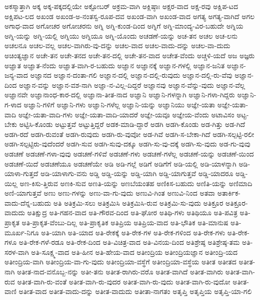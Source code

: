 {ಅಕಸ್ಮಾತ್ತಾಗಿ
ಅಕ್ಕ
ಅಕ್ಕ-ಪಕ್ಕದಲ್ಲಿಯೇ
ಅಕ್ಟೋಬರ್
ಅಕ್ರಮ-ವಾಗಿ
ಅಕ್ಲಿಷ್ಠಾಃ
ಅಕ್ಷರ-ವಾದ
ಅಕ್ಷ-ರವು
ಅಕ್ಷಿಪ-ಟದ
ಅಕ್ಷಿಪಟ-ಲದ
ಅಖಂಡ
ಅಖಂಡ-ಅ-ನಂತಸ್ವ-ರೂಪ-ದವ
ಅಖಂಡ-ವಾಗಿ
ಅಖಂಡ-ವಾದ
ಅಗತ್ಯ
ಅಗತ್ಯ-ವಾಗಿದೆ
ಅಗಲ
ಅಗಾಧ-ವಾದ
ಅಗೋಚರ
ಅಗೋಚರನು
ಅಗ್ನಿ
ಅಗ್ನಿ-ಕುಂಡ-ದಿಂದ
ಅಗ್ನಿಗೆ
ಅಗ್ನಿ-ಮಾಂದ್ಯ-ವಿರ-ಬಹುದೇ
ಅಗ್ನಿಯ
ಅಗ್ನಿ-ಯನ್ನು
ಅಗ್ನಿ-ಯಲ್ಲಿ
ಅಗ್ನಿಯು
ಅಗ್ನಿಯೂ
ಅಗ್ನಿ-ಯೊಂದು
ಅಚಡಣೆ-ಯನ್ನು
ಅಚ-ತನ
ಅಚಲ
ಅಚ-ಲನು
ಅಚಲನೂ
ಅಚಲ-ವಲ್ಲ
ಅಚಲ-ವಾಗಿರು-ವು-ದನ್ನು
ಅಚಲ-ವಾದ
ಅಚಲ-ವಾದು-ದನ್ನು
ಅಚಲ-ವಾ-ದುದು
ಅಚಿಂತ್ಯಜ್ಞಾನ
ಅಚೇ-ತನ
ಅಚೇ-ತನದ
ಅಚೇ-ತನ-ದಲ್ಲಿ
ಅಚೇ-ತನ-ವಾದ
ಅಚೇತ-ವೆಂದು
ಅಚ್ಚಳಿ-ಯದೆ
ಅಜ
ಅಜ್ಞರು
ಅಜ್ಞಾತ
ಅಜ್ಞಾತ-ನೆಂದು
ಅಜ್ಞಾತ-ವಾಗಿ-ರ-ಬಹುದು
ಅಜ್ಞಾನ
ಅಜ್ಞಾನಕ್ಕೆ
ಅಜ್ಞಾನ-ಗಳಲ್ಲಿ
ಅಜ್ಞಾನ-ಜನಿತ
ಅಜ್ಞಾನ-ಜನ್ಯ-ವಾದ
ಅಜ್ಞಾನದ
ಅಜ್ಞಾನ-ದಂತಾ-ಗಲಿ
ಅಜ್ಞಾನ-ದಲ್ಲಿ
ಅಜ್ಞಾನ-ದಲ್ಲಿ-ರುವುದು
ಅಜ್ಞಾನ-ದಲ್ಲಿ-ರು-ವೆವು
ಅಜ್ಞಾನ-ದಿಂದ
ಅಜ್ಞಾನ-ವನ್ನು
ಅಜ್ಞಾನ-ವಶ-ನಾಗಿ
ಅಜ್ಞಾ-ನ-ವಿಲ್ಲ-ದಿದ್ದರೆ
ಅಜ್ಞಾನವು
ಅಜ್ಞಾನ-ವೆನ್ನು-ವುದು
ಅಜ್ಞಾನ-ವೆಲ್ಲ
ಅಜ್ಞಾನವೇ
ಅಜ್ಞಾನಾಂಧ-ಕಾರ-ದಲ್ಲಿ
ಅಜ್ಞಾನಾ-ತೀತ-ನಾದ
ಅಜ್ಞಾನಿ
ಅಜ್ಞಾನಿ-ಗಳನ್ನಾಗಿ
ಅಜ್ಞಾನಿ-ಗಳಾ-ಗಿದ್ದರು
ಅಜ್ಞಾನಿ-ಗ-ಳಾದ
ಅಜ್ಞಾನಿ-ಗಳಿಗೆ
ಅಜ್ಞಾನಿ-ಗಳು
ಅಜ್ಞಾನಿ-ಗಳೆಲ್ಲ
ಅಜ್ಞಾನಿ-ಯನ್ನು
ಅಜ್ಞಾನಿಯು
ಅಜ್ಞೇ-ಯತಾ
ಅಜ್ಞೇ-ಯತಾ-ವಾದಿ
ಅಜ್ಞೇ-ಯತಾ-ವಾದಿ-ಗಳು
ಅಜ್ಞೇ-ಯತಾ-ವಾದಿ-ಯಾದರೆ
ಅಜ್ಞೇ-ಯವೂ
ಅಜ್ಞೇಯ-ವೆಂದು
ಅಟಾವಿಸಂ
ಅಟ್ಟ-ಬೇಕು
ಅಟ್ಟಿಸಿ-ಕೊಂಡು
ಅಟ್ಟುತ್ತವೆ
ಅಟ್ಟುತ್ತಿದ್ದರೆ
ಅಡಕ-ಮಾಡಿ-ದ್ದಾರೆ
ಅಡಗಿ
ಅಡಗಿ-ಕೊಂಡು
ಅಡ-ಗಿತ್ತು
ಅಡ-ಗಿದೆ
ಅಡಗಿ-ರದೆ
ಅಡಗಿ-ರುವಂತೆ
ಅಡಗಿ-ರುವುದು
ಅಡಗಿ-ರು-ವುವೋ
ಅಡ-ಗಿವೆ
ಅಡಗಿ-ಸ-ಬೇಕಾ-ಗಿದೆ
ಅಡಗಿ-ಸಲ್ಪಟ್ಟಿ-ರಲೀ
ಅಡಗಿ-ಸಲ್ಪಟ್ಟಿರು-ವುದೆಂದರೆ
ಅಡಗಿ-ಸುವ
ಅಡಗಿ-ಸುವು-ದಕ್ಕೂ
ಅಡಗಿ-ಸು-ವು-ದಕ್ಕೆ
ಅಡಗಿ-ಸು-ವುದು
ಅಡ-ಗು-ವುವು
ಅಡಚಣೆ
ಅಡಚಣೆ-ಗಳಾ-ವುವು
ಅಡಚಣೆ-ಗಳಿವೆ
ಅಡಚಣೆ-ಗಳು
ಅಡಚಣೆ-ಗಳೆಲ್ಲ
ಅಡಚಣೆ-ಯನ್ನು
ಅಡಚಣೆ-ಯಿಂದ
ಅಡಚಣೆ-ಯಿದೆ
ಅಡಚಣೆಯೂ
ಅಡಚಣೆಯೇ
ಅಡಿ
ಅಡಿ-ಗಲ್ಲೆ
ಅಡಿಗೆ
ಅಡಿಗೆಗೆ
ಅಡಿ-ಯಲ್ಲಿ
ಅಡಿ-ಯಾಳನ್ನಾಗಿ
ಅಡಿ-ಯಾಳಾ-ಗುತ್ತದೆ
ಅಡಿ-ಯಾಳಾಗು-ವನು
ಅಡ್ಡಿ
ಅಡ್ಡಿ-ಯನ್ನು
ಅಡ್ಡಿ-ಯಾಗಿ
ಅಡ್ಡಿ-ಯಾಗುತ್ತವೆ
ಅಡ್ಡಿ-ಯಾದರೂ
ಅಡ್ಡಿ-ಯಿಲ್ಲ
ಅಣ-ಕಿಸು-ತ್ತಿರುವ
ಅಣಕಿ-ಸುವ
ಅಣತಿ-ಯನ್ನು
ಅಣಬೆಯಂತಹ
ಅಣಿಕಿಸ-ಬಹುದು
ಅಣಿತಿ-ಯನ್ನು
ಅಣಿಮಾದಿ
ಅಣಿ-ಯಾಗುತ್ತವೆ
ಅಣು
ಅಣು-ಗಳನ್ನು
ಅಣು-ವಾ-ಗು-ವುದು
ಅಣುವಿ-ಗಿಂತ
ಅಣುವಿ-ನಿಂದ
ಅತವಾ
ಅತಾರ್ಕಿಕ-ವಾದು-ದೆನ್ನ-ಬಹುದು
ಅತಿ
ಅತಿಕ್ರಮಿ-ಸಲು
ಅತಿಕ್ರಮಿಸಿ
ಅತಿಕ್ರಮಿಸಿ-ರುವ
ಅತಿಕ್ರಮಿ-ಸು-ವುದು
ಅತಿಕ್ರೂರ
ಅತಿಕ್ರೂರ-ವಾದುದು
ಅತಿಕ್ಷುದ್ರ
ಅತಿ-ಗಹನ-ವಾದ
ಅತಿ-ಗೌರವ-ದಿಂದ
ಅತಿ-ಘೋರ
ಅತಿಥಿ-ಗಳು
ಅತಿಥಿಯೂ
ಅತಿ-ಪವಿತ್ರ
ಅತಿ-ಪ್ರಾಕೃತ
ಅತಿ-ಪ್ರಾಕೃತ-ವೆಂಬು-ದಿಲ್ಲ
ಅತಿ-ಪ್ರಾಕೃತಿಕ
ಅತಿಪ್ರಿಯ
ಅತಿಪ್ರಿಯ-ವಾದ
ಅತಿ-ಭೌತಿಕ
ಅತಿ-ಮಾನುಷ
ಅತಿ-ಮೂರ್ಖ-ನಿಗೂ
ಅತಿ-ಯಾಗಿ
ಅತಿ-ಯಾದ
ಅತಿ-ರೇಕಕ್ಕೆ
ಅತಿ-ರೇಕ-ಗಳ
ಅತಿ-ರೇಕ-ಗಳಿಂದ
ಅತಿ-ರೇಕ-ಗಳು
ಅತಿ-ರೇಕ-ಗಳೂ
ಅತಿ-ರೇಕ-ಗಳೆ-ರಡೂ
ಅತಿ-ರೇಕ-ದಿಂದ
ಅತಿ-ವಿಚಿತ್ರ-ವಾದ
ಅತಿ-ವಿನಯ-ದಿಂದ
ಅತಿಶ್ರೇಷ್ಠ
ಅತಿಶ್ರೇಷ್ಠ-ತಮ
ಅತಿ-ಸರಳ-ವಾಗಿ
ಅತಿ-ಸೂಕ್ಷ್ಮ-ವಾದ
ಅತಿ-ಹೀನ
ಅತಿ-ಹೇಯ-ವಾದ
ಅತೀಂದ್ರಿಯ
ಅತೀಂದ್ರಿಯಜ್ಞಾನ
ಅತೀಂದ್ರಿ-ಯದ
ಅತೀಂದ್ರಿಯ-ವಾಗಿ
ಅತೀಂದ್ರಿಯ-ವಾ-ಗು-ವುದು
ಅತೀಂದ್ರಿಯಾ-ವಸ್ಥೆಗೆ
ಅತೀಂದ್ರಿಯಾ-ವಸ್ಥೆಯ
ಅತೀತ
ಅತೀತದ
ಅತೀತ-ನಾಗಿ
ಅತೀತ-ನಾದ-ವನೊಬ್ಬ-ನನ್ನು
ಅತೀ-ತನು
ಅತೀತ-ರಾಗಿರು-ವರೊ
ಅತೀತ-ವಾಗಿದೆ
ಅತೀತ-ವಾಗಿರು
ಅತೀತ-ವಾಗಿ-ರುವ
ಅತೀತ-ವಾಗಿ-ರು-ವಂತೆ
ಅತೀತ-ವಾಗಿ-ರು-ವುದರ
ಅತೀತ-ವಾಗಿ-ರು-ವುದು
ಅತೀತ-ವಾಗಿ-ರು-ವುದೋ
ಅತೀತ-ವಾಣಿ
ಅತೀತ-ವಾದ
ಅತೀತ-ವಾದು-ದನ್ನು
ಅತೀತ-ವಾದುದು
ಅತೀತಾ-ನಾಗತಂ
ಅತೃಪ್ತಿ
ಅತೃಪ್ತಿಯ
ಅತೃಪ್ತಿ-ಯಾ-ಗಲಿ
}
